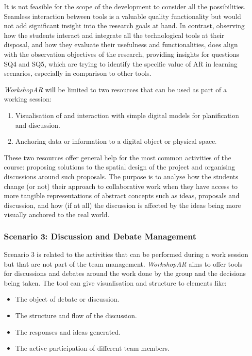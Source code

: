 It is not feasible for the scope of the development to consider all the possibilities. Seamless interaction between tools is a valuable quality functionality but would not
add significant insight into the research goals at hand. In contrast, observing how the students interact and integrate all the technological tools at their disposal, and
how they evaluate their usefulness and functionalities, does align with the observation objectives of the research, providing insights for questions SQ4 and SQ5, which are
trying to identify the specific value of \ac{AR} in learning scenarios, especially in comparison to other tools.

\emph{WorkshopAR} will be limited to two resources that can be used as part of a working session:

\begin{enumerate}
    \item Visualisation of and interaction with simple digital models for planification and discussion.
    \item Anchoring data or information to a digital object or physical space.
\end{enumerate}

These two resources offer general help for the most common activities of the course: proposing solutions to the spatial design of the project and organising discussions
around such proposals. The purpose is to analyse how the students change (or not) their approach to collaborative work when they have access to more tangible
representations of abstract concepts such as ideas, proposals and discussion, and how (if at all) the discussion is affected by the ideas being more visually anchored to
the real world.

\subsubsection{Scenario 3: Discussion and Debate Management \label{sec:4-1-2-3}}

Scenario 3 is related to the activities that can be performed during a work session but that are not part of the team management. \emph{WorkshopAR} aims to offer tools for
discussions and debates around the work done by the group and the decisions being taken. The tool can give visualisation and structure to elements like:

\begin{itemize}
    \item The object of debate or discussion.
    \item The structure and flow of the discussion.
    \item The responses and ideas generated.
    \item The active participation of different team members.
\end{itemize}


